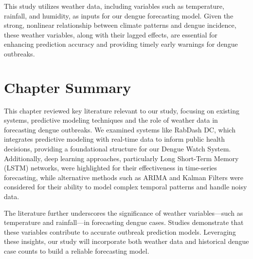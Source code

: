 This study utilizes weather data, including variables such as temperature, rainfall, and humidity, as inputs for our dengue forecasting model. Given the strong, nonlinear relationship between climate patterns and dengue incidence, these weather variables, along with their lagged effects, are essential for enhancing prediction accuracy and providing timely early warnings for dengue outbreaks.


\section{Chapter Summary}
This chapter reviewed key literature relevant to our study, focusing on existing systems, predictive modeling techniques and the role of weather data in forecasting dengue outbreaks. We examined systems like RabDash DC, which integrates predictive modeling with real-time data to inform public health decisions, providing a foundational structure for our Dengue Watch System. Additionally, deep learning approaches, particularly Long Short-Term Memory (LSTM) networks, were highlighted for their effectiveness in time-series forecasting, while alternative methods such as ARIMA and Kalman Filters were considered for their ability to model complex temporal patterns and handle noisy data.

The literature further underscores the significance of weather variables—such as temperature and rainfall—in forecasting dengue cases. Studies demonstrate that these variables contribute to accurate outbreak prediction models. Leveraging these insights, our study will incorporate both weather data and historical dengue case counts to build a reliable forecasting model.















